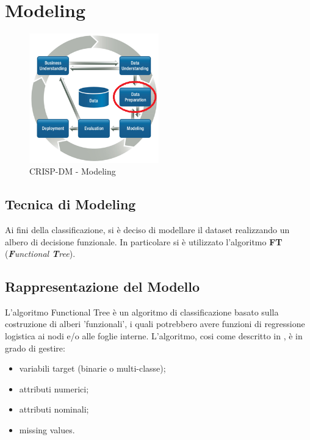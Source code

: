 \chapter{Modeling}

\begin{figure}[hbtp]
	\centering
	\includegraphics[width=0.5\textwidth]{./images/CRISPDM_3.png}
	\caption{CRISP-DM - Modeling}
	\label{CRISPDM_4}
\end{figure}

\section{Tecnica di Modeling}
Ai fini della classificazione, si è deciso di modellare il dataset realizzando un albero di decisione funzionale. In particolare si è utilizzato l'algoritmo \textbf{FT} (\emph{\textbf{F}unctional \textbf{T}ree}).

\section{Rappresentazione del Modello}
L'algoritmo Functional Tree è un algoritmo di classificazione basato sulla costruzione di alberi 'funzionali', i quali potrebbero avere funzioni di regressione logistica ai nodi e/o alle foglie interne. L'algoritmo, cosi come descritto in \cite{Gama:2004:FT:990375.990395}, è in grado di gestire:
\begin{itemize}
	\item variabili target (binarie o multi-classe);
	\item attributi numerici;
	\item attributi nominali;
	\item missing values.
\end{itemize}

